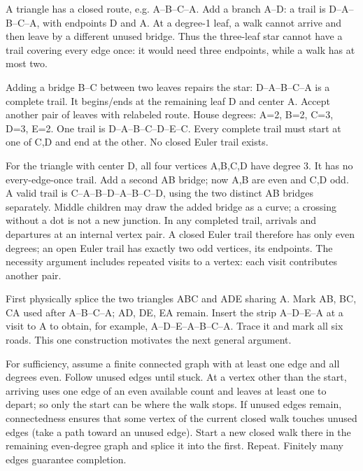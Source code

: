 \documentclass[11pt]{article}
\begin{document}
A triangle has a closed route, e.g. A--B--C--A. Add a branch A--D: a trail is D--A--B--C--A, with endpoints D and A. At a degree-1 leaf, a walk cannot arrive and then leave by a different unused bridge. Thus the three-leaf star cannot have a trail covering every edge once: it would need three endpoints, while a walk has at most two.

Adding a bridge B--C between two leaves repairs the star: D--A--B--C--A is a complete trail. It begins/ends at the remaining leaf D and center A. Accept another pair of leaves with relabeled route.
House degrees: A=2, B=2, C=3, D=3, E=2. One trail is D--A--B--C--D--E--C. Every complete trail must start at one of C,D and end at the other. No closed Euler trail exists.

For the triangle with center D, all four vertices A,B,C,D have degree 3. It has no every-edge-once trail. Add a second AB bridge; now A,B are even and C,D odd. A valid trail is C--A--B--D--A--B--C--D, using the two distinct AB bridges separately. Middle children may draw the added bridge as a curve; a crossing without a dot is not a new junction.
In any completed trail, arrivals and departures at an internal vertex pair. A closed Euler trail therefore has only even degrees; an open Euler trail has exactly two odd vertices, its endpoints. The necessity argument includes repeated visits to a vertex: each visit contributes another pair.

First physically splice the two triangles ABC and ADE sharing A. Mark AB, BC, CA used after A--B--C--A; AD, DE, EA remain. Insert the strip A--D--E--A at a visit to A to obtain, for example, A--D--E--A--B--C--A. Trace it and mark all six roads. This one construction motivates the next general argument.

For sufficiency, assume a finite connected graph with at least one edge and all degrees even. Follow unused edges until stuck. At a vertex other than the start, arriving uses one edge of an even available count and leaves at least one to depart; so only the start can be where the walk stops. If unused edges remain, connectedness ensures that some vertex of the current closed walk touches unused edges (take a path toward an unused edge). Start a new closed walk there in the remaining even-degree graph and splice it into the first. Repeat. Finitely many edges guarantee completion.
\end{document}
